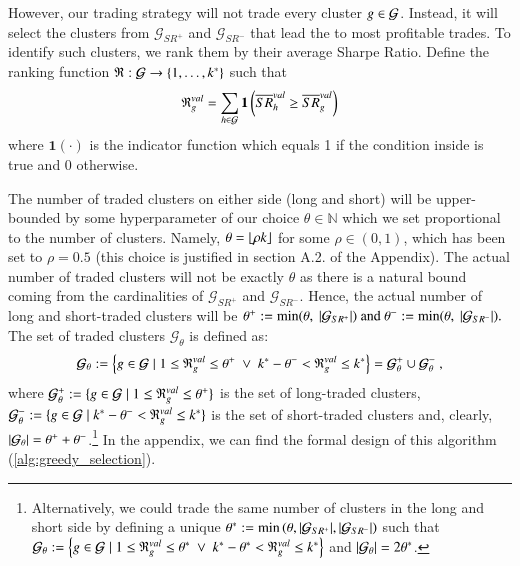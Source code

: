 \mx 
However, our trading strategy will not trade every cluster $g\in\mathcal{G}$. Instead, it will select the clusters from $\mathcal G_{SR^+}$ and $\mathcal G_{SR^-}$ that lead the to most profitable trades. 
To identify such clusters, we rank them by their average Sharpe Ratio. Define the ranking function $\mathfrak{R}: \mathcal{G} \to \left\{1, \ldots, k^*\right\}$ such that
$$
\mathfrak{R}_g^{val}
=
\sum_{h \in \mathcal{G}} 
\mathbf{1}\left(
\overline{S R}_h^{val} \geq \overline{S R}_g^{val} 
\right)
$$
where $\mathbf{1}(\cdot)$ is the indicator function which equals 1 if the condition inside is true and 0 otherwise.

\mx
The number of traded clusters on either side (long and short) will be upper-bounded by some hyperparameter of our choice $\theta \in \mathbb{N}$
which we set proportional to the number of clusters. Namely, $\theta =\lfloor \rho k \rfloor$ for some $\rho\in(0,1)$, which has been set to $\rho=0.5$ (this choice is justified in section A.2. of the Appendix).
%
The actual number of traded clusters will not be exactly $\theta$ as there is a natural bound coming from the cardinalities of $\mathcal G_{SR^+}$ and $\mathcal G_{SR^-}$. Hence, the actual number of long and short-traded clusters will be
$
\theta^+ := \min(\theta, ~|\mathcal G_{SR^+}|)
~\text{and}~
\theta^- := \min(\theta, ~|\mathcal G_{SR^-}|)
.
$
The set of traded clusters $\mathcal G_{\theta}$ is defined as:
$$
\mathcal{G}_\theta := 
\left\{
g \in \mathcal G 
\mid 
1\leq \mathfrak{R}_g^{val} \leq \theta^+
~\vee~ 
k^* -\theta^- < \mathfrak{R}_g^{val} \leq k^*
\right\} 
= 
\mathcal{G}_{\theta}^+ \cup \mathcal{G}_{\theta}^-
~,
$$
where
$
\mathcal{G}_{\theta}^+ := 
\{ g \in\mathcal{G} \mid 
1\leq \mathfrak{R}_g^{val} \leq \theta^+
\}
$
is the set of long-traded clusters,
$
\mathcal{G}_{\theta}^- := 
\{ g \in\mathcal{G} \mid 
k^*-\theta^-
< \mathfrak{R}_g^{val} \leq 
k^*
\}
$
is the set of short-traded clusters 
and, clearly, $\left|\mathcal{G}_{\theta}\right|=\theta^+ + \theta^- $.\footnote{
Alternatively, we could trade the same number of clusters in the long and short side by defining a unique 
$
\theta^* := \min\left(\theta, |\mathcal G_{SR^+}|, |\mathcal G_{SR^-}| \right)
$
such that
$
\mathcal{G}_\theta := 
\left\{
g \in \mathcal G 
\mid 
1\leq \mathfrak{R}_g^{val} \leq \theta^*
~\vee~ 
k^*-\theta^* < \mathfrak{R}_g^{val} \leq k^*
\right\} 
$
and 
$\left|\mathcal{G}_\theta\right|=2\theta^*$.
}
In the appendix, we can find the formal design of this algorithm (\cref{alg:greedy_selection}).

